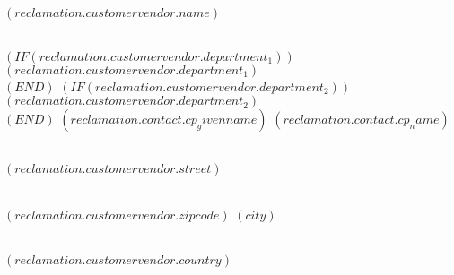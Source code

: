 \documentclass[paper=a4,fontsize=10pt]{scrartcl}
\begin{document}
\begin{letter}{
  $( reclamation.customervendor.name )$\strut\\
  $( IF (reclamation.customervendor.department_1) )$$( reclamation.customervendor.department_1 )$\\$( END )$%
  $( IF (reclamation.customervendor.department_2) )$$( reclamation.customervendor.department_2 )$\\$( END )$%
  $( reclamation.contact.cp_givenname )$ $( reclamation.contact.cp_name )$\strut\\
  $( reclamation.customervendor.street )$\strut\\
  $( reclamation.customervendor.zipcode )$ $( city )$\strut\\
  $( reclamation.customervendor.country )$ \strut
    }

    \opening{
    }
    \thispagestyle{kivitendo.letter.first}

    \ekreklamationsformel


\end{letter}
\end{document}
